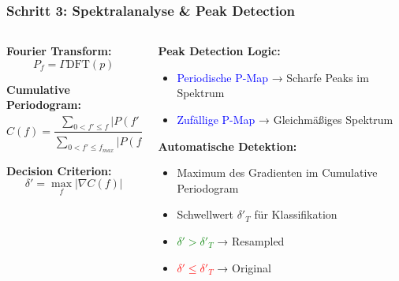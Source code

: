 \documentclass[11pt,t,usepdftitle=false,aspectratio=169]{beamer}
\begin{document}
\begin{frame}
	\frametitle{Schritt 3: Spektralanalyse \& Peak Detection}
	
	\begin{columns}[T]
		\begin{column}{0.45\textwidth}
			\textbf{Fourier Transform:}
			$$P_f = \Gamma\text{DFT}(p)$$
			
			\vspace{0.5em}
			\textbf{Cumulative Periodogram:}
			$$C(f) = \frac{\sum_{0<f' \leq f} |P(f')|^2}{\sum_{0<f' \leq f_{max}} |P(f')|^2}$$
			
			\vspace{0.5em}
			\textbf{Decision Criterion:}
			$$\delta' = \max_f |\nabla C(f)|$$
		\end{column}
		\begin{column}{0.5\textwidth}
			\textbf{Peak Detection Logic:}
			\begin{itemize}
				\item \textcolor{blue}{Periodische P-Map} → Scharfe Peaks im Spektrum
				\item \textcolor{blue}{Zufällige P-Map} → Gleichmäßiges Spektrum
			\end{itemize}
			
			\vspace{0.5em}
			\textbf{Automatische Detektion:}
			\begin{itemize}
				\item Maximum des Gradienten im Cumulative Periodogram
				\item Schwellwert $\delta'_T$ für Klassifikation
				\item \textcolor{green}{$\delta' > \delta'_T$} → Resampled
				\item \textcolor{red}{$\delta' \leq \delta'_T$} → Original
			\end{itemize}
		\end{column}
	\end{columns}
\end{frame}
\end{document}
